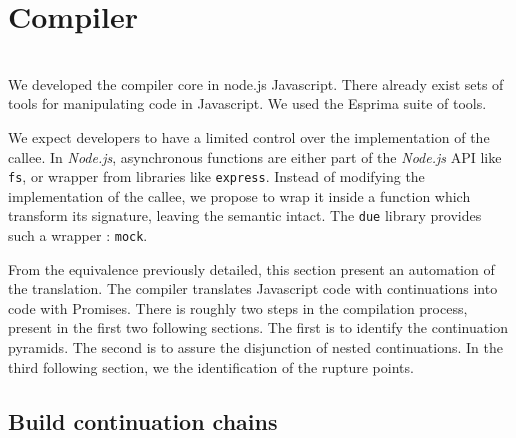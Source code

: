 \section{Compiler} \label{section:compiler}

\\

We developed the compiler core in node.js Javascript.
There already exist sets of tools for manipulating code in Javascript.
We used the Esprima suite of tools.


We expect developers to have a limited control over the implementation of the callee.
In \textit{Node.js}, asynchronous functions are either part of the \textit{Node.js} API like \texttt{fs}, or wrapper from libraries like \texttt{express}.
Instead of modifying the implementation of the callee, we propose to wrap it inside a function which transform its signature, leaving the semantic intact.
The \texttt{due} library provides such a wrapper : \texttt{mock}.


From the equivalence previously detailed, this section present an automation of the translation.
The compiler translates Javascript code with continuations into code with Promises.
There is roughly two steps in the compilation process, present in the first two following sections.
The first is to identify the continuation pyramids.
The second is to assure the disjunction of nested continuations.
In the third following section, we the identification of the rupture points.



\subsection{Build continuation chains} \label{section:compiler:chain}


